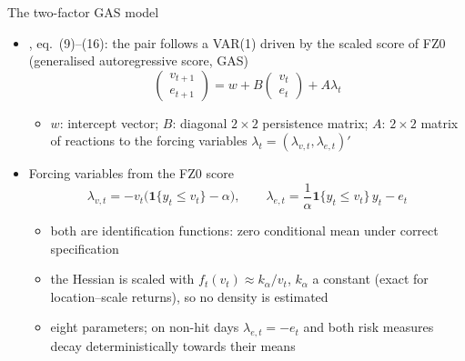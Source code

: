\begin{frame}{The two-factor GAS model}
\itemsize{\small}
\begin{itemize}
    \item {}, eq.~(9)--(16): the pair follows a VAR(1) driven by the scaled score of FZ0 (generalised autoregressive score, GAS)
    \[ \begin{pmatrix} v_{t+1} \\ e_{t+1}\end{pmatrix} = w + B\begin{pmatrix} v_t \\ e_t\end{pmatrix} + A\lambda_t \]
    \begin{itemize}
        \item $w$: intercept vector; $B$: diagonal $2\times2$ persistence matrix; $A$: $2\times2$ matrix of reactions to the forcing variables $\lambda_t = (\lambda_{v,t}, \lambda_{e,t})'$
    \end{itemize}
    \item Forcing variables from the FZ0 score
    \[ \lambda_{v,t} = -v_t\big(\mathbf 1\{y_t \le v_t\} - \alpha\big), \qquad \lambda_{e,t} = \frac{1}{\alpha}\mathbf 1\{y_t \le v_t\}\,y_t - e_t \]
    \begin{itemize}
        \item both are identification functions: zero conditional mean under correct specification
        \item the Hessian is scaled with $f_t(v_t) \approx k_\alpha/v_t$, $k_\alpha$ a constant (exact for location--scale returns), so no density is estimated
        \item eight parameters; on non-hit days $\lambda_{e,t} = -e_t$ and both risk measures decay deterministically towards their means
    \end{itemize}
\end{itemize}
\end{frame}

